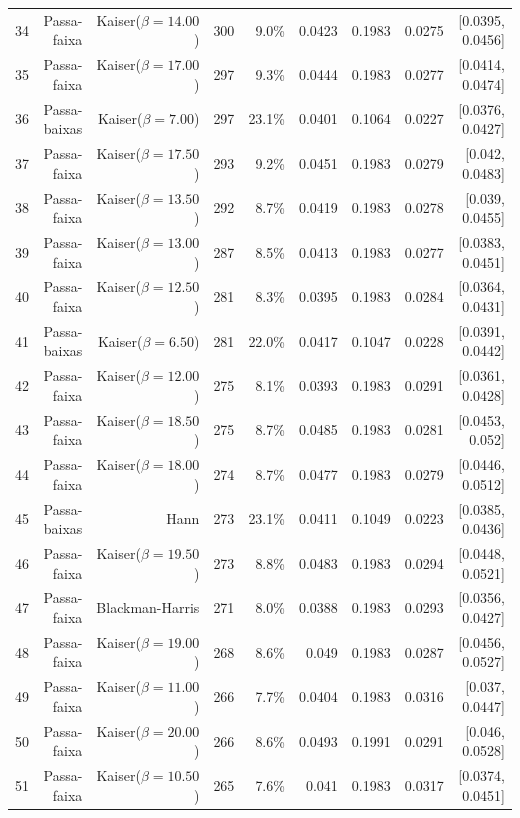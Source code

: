 \begin{longtable}{lrrrrrrrr}
    34 & Passa-faixa & Kaiser($\beta=14.00$) & 300 & 9.0\% & 0.0423 & 0.1983 & 0.0275 & [0.0395, 0.0456] \\
    35 & Passa-faixa & Kaiser($\beta=17.00$) & 297 & 9.3\% & 0.0444 & 0.1983 & 0.0277 & [0.0414, 0.0474] \\
    36 & Passa-baixas & Kaiser($\beta=7.00$) & 297 & 23.1\% & 0.0401 & 0.1064 & 0.0227 & [0.0376, 0.0427] \\
    37 & Passa-faixa & Kaiser($\beta=17.50$) & 293 & 9.2\% & 0.0451 & 0.1983 & 0.0279 & [0.042, 0.0483] \\
    38 & Passa-faixa & Kaiser($\beta=13.50$) & 292 & 8.7\% & 0.0419 & 0.1983 & 0.0278 & [0.039, 0.0455] \\
    39 & Passa-faixa & Kaiser($\beta=13.00$) & 287 & 8.5\% & 0.0413 & 0.1983 & 0.0277 & [0.0383, 0.0451] \\
    40 & Passa-faixa & Kaiser($\beta=12.50$) & 281 & 8.3\% & 0.0395 & 0.1983 & 0.0284 & [0.0364, 0.0431] \\
    41 & Passa-baixas & Kaiser($\beta=6.50$) & 281 & 22.0\% & 0.0417 & 0.1047 & 0.0228 & [0.0391, 0.0442] \\
    42 & Passa-faixa & Kaiser($\beta=12.00$) & 275 & 8.1\% & 0.0393 & 0.1983 & 0.0291 & [0.0361, 0.0428] \\
    43 & Passa-faixa & Kaiser($\beta=18.50$) & 275 & 8.7\% & 0.0485 & 0.1983 & 0.0281 & [0.0453, 0.052] \\
    44 & Passa-faixa & Kaiser($\beta=18.00$) & 274 & 8.7\% & 0.0477 & 0.1983 & 0.0279 & [0.0446, 0.0512] \\
    45 & Passa-baixas & Hann & 273 & 23.1\% & 0.0411 & 0.1049 & 0.0223 & [0.0385, 0.0436] \\
    46 & Passa-faixa & Kaiser($\beta=19.50$) & 273 & 8.8\% & 0.0483 & 0.1983 & 0.0294 & [0.0448, 0.0521] \\
    47 & Passa-faixa & Blackman-Harris & 271 & 8.0\% & 0.0388 & 0.1983 & 0.0293 & [0.0356, 0.0427] \\
    48 & Passa-faixa & Kaiser($\beta=19.00$) & 268 & 8.6\% & 0.049 & 0.1983 & 0.0287 & [0.0456, 0.0527] \\
    49 & Passa-faixa & Kaiser($\beta=11.00$) & 266 & 7.7\% & 0.0404 & 0.1983 & 0.0316 & [0.037, 0.0447] \\
    50 & Passa-faixa & Kaiser($\beta=20.00$) & 266 & 8.6\% & 0.0493 & 0.1991 & 0.0291 & [0.046, 0.0528] \\
    51 & Passa-faixa & Kaiser($\beta=10.50$) & 265 & 7.6\% & 0.041 & 0.1983 & 0.0317 & [0.0374, 0.0451] \\

\end{longtable}
